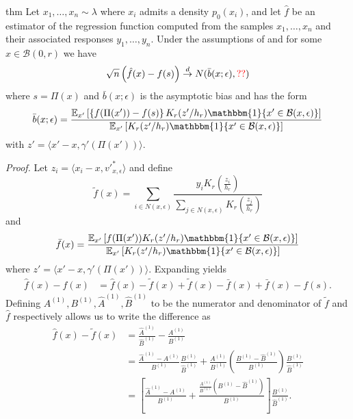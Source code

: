 \documentclass[11pt]{article}
\begin{document}
\begin{restatable}{thm}{} \label{thm: regression ptwise clt}
    Let $x_1, \dots, x_n \sim \lambda$ where $x_i$ admits a density $p_0(x_i)$, and let $\hat{f}$ be an estimator of the regression function computed from the samples $x_1, \dots, x_n$ and their associated responses $y_1, \dots, y_n$. Under the assumptions of  and for some $x\in \mathcal{B}(0, r)$ we have
    \[\sqrt{n}\left(\hat{f}(x) - f(s)\right) \overset{d}{\rightarrow} N(\bar{b}(x; \epsilon), \textcolor{red}{??}) \]
    where $s = \Pi(x)$ and $\bar{b}(x;\epsilon)$ is the asymptotic bias and has the form
    \begin{equation}
        \bar{b}(x; \epsilon) = \frac{\mathbb{E}_{x'}\left[\left\{f(\Pi(x')) - f(s)\right\}K_r(z'/h_r)\mathbbm{1}\{x'\in \mathcal{B}(x, \epsilon)\}\right]}{\mathbb{E}_{x'}\left[K_r(z'/h_r)\mathbbm{1}\{x'\in \mathcal{B}(x, \epsilon)\}\right]}
    \end{equation}
    with $z' = \langle x' - x, \gamma'(\Pi(x'))\rangle.$
\end{restatable}
\noindent \textit{Proof.} Let $z_i = \langle x_i - x, v'^*_{x, \epsilon}\rangle$ and define
\[\tilde{f}(x) = \sum_{i \in N(x, \epsilon)}\frac{y_iK_r(\frac{z_i}{h_r})}{\sum_{j \in N(x, \epsilon)}K_r(\frac{z_j}{h_r})}\]
and
\[\bar{f}(x) = \frac{\mathbb{E}_{x'}\left[f(\Pi(x'))K_r(z'/h_r)\mathbbm{1}\{x'\in \mathcal{B}(x, \epsilon)\}\right]}{\mathbb{E}_{x'}\left[K_r(z'/h_r)\mathbbm{1}\{x'\in \mathcal{B}(x, \epsilon)\}\right]}\]
where $z' = \langle x'-x,\gamma'(\Pi(x'))\rangle$. Expanding yields
\begin{align}
    \hat{f}(x) - f(x) &= \hat{f}(x) - \tilde{f}(x) + 
    \tilde{f}(x) - \bar{f}(x) + \bar{f}(x) - f(s).
\end{align}
Defining $A^{(1)}, B^{(1)}, \widehat{A}^{(1)}, \widehat{B}^{(1)}$ to be the numerator and denominator of $\tilde{f}$ and $\hat{f}$ respectively allows us to write the difference as
\begin{align}
    \hat{f}(x) - \tilde{f}(x)  &= \frac{\widehat{A}^{(1)}}{\widehat{B}^{(1)}} - \frac{A^{(1)}}{B^{(1)}} \\
    &= \frac{\widehat{A}^{(1)}-A^{(1)}}{B^{(1)}}\frac{B^{(1)}}{\widehat{B}^{(1)}} + \frac{A^{(1)}}{B^{(1)}}\left(\frac{B^{(1)} - \widehat{B}^{(1)}}{B^{(1)}}\right)\frac{B^{(1)}}{\widehat{B}^{(1)}} \\
    &= 
    \left[\frac{\widehat{A}^{(1)}-A^{(1)}}{B^{(1)}} + \frac{\frac{A^{(1)}}{B^{(1)}}\left(B^{(1)} - \widehat{B}^{(1)}\right)}{B^{(1)}}\right]\frac{B^{(1)}}{\widehat{B}^{(1)}}. \label{eq: kdr estimator decomp}
\end{align}
\end{document}
